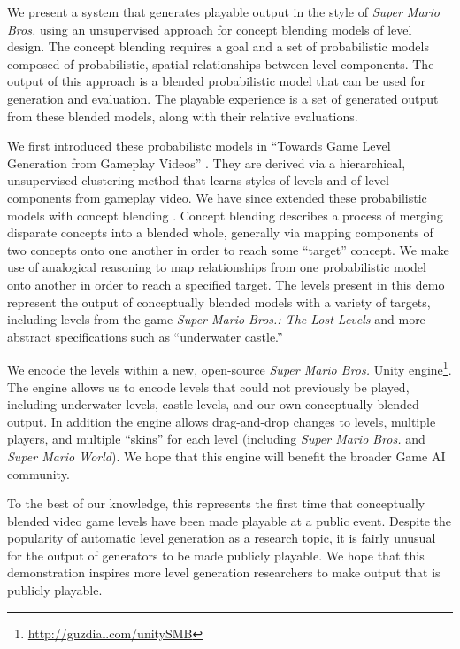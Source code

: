 \documentclass[letterpaper]{article}
\begin{document}
We present a system that generates playable output in the style of \textit{Super Mario Bros.} using an unsupervised approach for concept blending models of level design.
The concept blending requires a goal and a set of probabilistic models composed of probabilistic, spatial relationships between level components.
The output of this approach is a blended probabilistic model that can be used for generation and evaluation.
The playable experience is a set of generated output from these blended models, along with their relative evaluations.

We first introduced these probabilistc models in ``Towards Game Level Generation from Gameplay Videos'' \cite{guzdial2015:video-level-gen}.
They are derived via a hierarchical, unsupervised clustering method that learns styles of levels and of level components from gameplay video.
We have since extended these probabilistic models with concept blending \cite{guzdial2016:mario-blend}.
Concept blending describes a process of merging disparate concepts into a blended whole, generally via mapping components of two concepts onto one another in order to reach some ``target'' concept.
We make use of analogical reasoning to map relationships from one probabilistic model onto another in order to reach a specified target.
The levels present in this demo represent the output of conceptually blended models with a variety of targets, including levels from the game \textit{Super Mario Bros.: The Lost Levels} and more abstract specifications such as ``underwater castle.''

We encode the levels within a new, open-source \textit{Super Mario Bros.} Unity engine\footnote{\url{http://guzdial.com/unitySMB}}.
The engine allows us to encode levels that could not previously be played, including underwater levels, castle levels, and our own conceptually blended output.
In addition the engine allows drag-and-drop changes to levels, multiple players, and multiple ``skins'' for each level (including \textit{Super Mario Bros.} and \textit{Super Mario World}).
We hope that this engine will benefit the broader Game AI community.

To the best of our knowledge, this represents the first time that conceptually blended video game levels have been made playable at a public event.
Despite the popularity of automatic level generation as a research topic, it is fairly unusual for the output of generators to be made publicly playable.
We hope that this demonstration inspires more level generation researchers to make output that is publicly playable.
\end{document}
